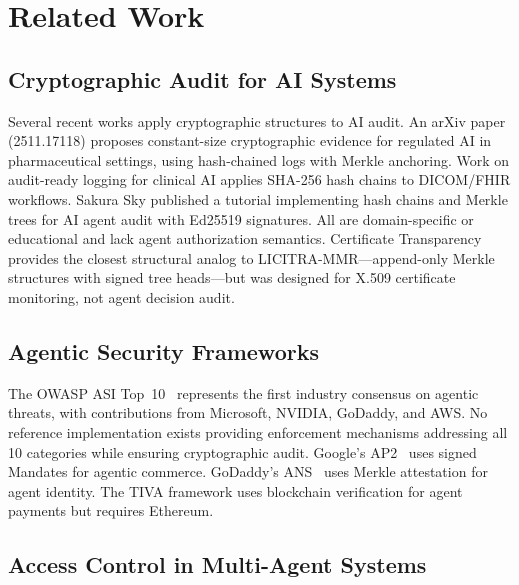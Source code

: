 \documentclass[11pt,a4paper]{article}
\begin{document}


\section{Related Work}\label{sec:related}

\subsection{Cryptographic Audit for AI Systems}

Several recent works apply cryptographic structures to AI audit. An arXiv paper (2511.17118)
proposes constant-size cryptographic evidence for regulated AI in pharmaceutical settings, using
hash-chained logs with Merkle anchoring. Work on audit-ready logging for clinical AI applies
SHA-256 hash chains to DICOM/FHIR workflows. Sakura Sky published a tutorial implementing
hash chains and Merkle trees for AI agent audit with Ed25519 signatures. All are domain-specific
or educational and lack agent authorization semantics. Certificate Transparency~\cite{ct}
provides the closest structural analog to LICITRA-MMR---append-only Merkle structures with
signed tree heads---but was designed for X.509 certificate monitoring, not agent decision audit.

\subsection{Agentic Security Frameworks}

The OWASP ASI Top~10~\cite{owasp} represents the first industry consensus on agentic threats,
with contributions from Microsoft, NVIDIA, GoDaddy, and AWS. No reference implementation
exists providing enforcement mechanisms addressing all 10 categories while ensuring cryptographic
audit. Google's AP2~\cite{googleap2} uses signed Mandates for agentic commerce. GoDaddy's
ANS~\cite{godaddyans} uses Merkle attestation for agent identity. The TIVA framework uses
blockchain verification for agent payments but requires Ethereum.

\subsection{Access Control in Multi-Agent Systems}
\end{document}
